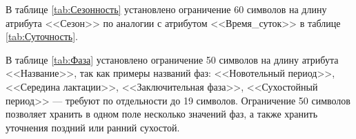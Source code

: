 \begin{table}[H]
\centering
\caption{Сезонность (Season)}
\label{tab:Сезонность}
\end{table}

В таблице \ref{tab:Сезонность} установлено ограничение 60 символов на длину атрибута <<Сезон>> по аналогии с атрибутом <<Время\_суток>> в таблице \ref{tab:Суточность}.

\begin{table}[H]
\centering
\caption{Фаза\_лактации (Lactation\_phase)}
\label{tab:Фаза}
\end{table}
В таблице \ref{tab:Фаза} установлено ограничение 50 символов на длину атрибута <<Название>>, так как примеры названий фаз: <<Новотельный период>>, <<Середина лактации>>, <<Заключительная фаза>>, <<Сухостойный период>> --- требуют по отдельности до 19 символов. Ограничение 50 символов позволяет хранить в одном поле несколько значений фаз, а также хранить уточнения поздний или ранний сухостой.

\begin{table}[H]
\centering
\caption{Вид\_корма (Feed\_type)}
\label{tab:Вид}
\end{table}

